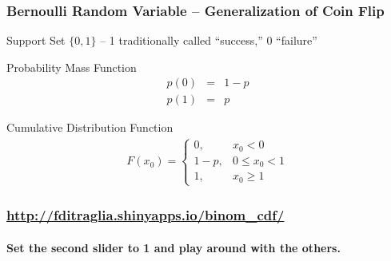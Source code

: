 \documentclass[handout]{beamer}
\begin{document}
\begin{frame}
\frametitle{Bernoulli Random Variable -- Generalization of Coin Flip}
\small
\begin{block}{Support Set}
$\{0,1\}$ -- 1 traditionally called ``success,'' 0 ``failure''
\end{block}

\begin{block}{Probability Mass Function}
	\begin{eqnarray*}
		p(0) &=& 1-p\\
		p(1) &=& p
	\end{eqnarray*}

	\begin{block}{Cumulative Distribution Function}
\begin{eqnarray*}
	F(x_0) = \left\{\begin{array}{ll} 0,& x_0 < 0\\ 1-p, &0\leq x_0 < 1\\ 1,& x_0 \geq 1\end{array}\right.
\end{eqnarray*}
\end{block}
\end{block}

\end{frame}
\begin{frame}
	\frametitle{\href{http://fditraglia.shinyapps.io/binom_cdf/}{http://fditraglia.shinyapps.io/binom\_cdf/}}
\framesubtitle{Set the second slider to 1 and play around with the others.}

\begin{figure}
\end{figure}

\end{frame}
\end{document}
